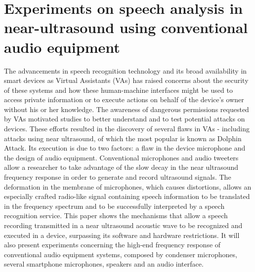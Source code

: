 \chapter{Experiments on speech analysis in near-ultrasound using conventional audio equipment}\label{ch:melchioraugus10}
\begin{affils}
\end{affils}

The advancements in speech recognition technology and its broad availability in smart devices as Virtual Assistants (VAs) has raised concerns about the security of these systems and how these human-machine interfaces might be used to access private information or to execute actions on behalf of the device's owner without his or her knowledge. The awareness of dangerous permissions requested by VAs motivated studies to better understand and to test potential attacks on devices. These efforts resulted in the discovery of several flaws in VAs - including attacks using near ultrasound, of which the most popular is known as Dolphin Attack. Its execution is due to two factors: a flaw in the device microphone and the design of audio equipment. Conventional microphones and audio tweeters allow a researcher to take advantage of the slow decay in the near ultrasound frequency response in order to generate and record ultrasound signals. The deformation in the membrane of microphones, which causes distortions, allows an especially crafted radio-like signal containing speech information to be translated in the frequency spectrum and to be successfully interpreted by a speech recognition service. This paper shows the mechanisms that allow a speech recording transmitted in a near ultrasound acoustic wave to be recognized and executed in a device, surpassing its software and hardware restrictions. It will also present experiments concerning the high-end frequency response of conventional audio equipment systems, composed by condenser microphones, several smartphone microphones, speakers and an audio interface.

